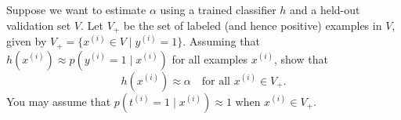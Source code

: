 \clearpage
\item {}
Suppose we want to estimate $\alpha$ using a trained classifier $h$ and a
held-out validation set $V$. Let $V_{+}$ be the set of labeled (and hence
positive) examples in $V$, given by $V_{+} = \{x^{(i)}\in V\mid y^{(i)} = 1\}$.
Assuming that  $h(x^{(i)})\approx p(y^{(i)} = 1\mid x^{(i)})$ for all
examples $x^{(i)}$, show that
%
\begin{equation*}
	h(x^{(i)}) \approx \alpha \quad\text{for all } x^{(i)}\in V_{+}.
\end{equation*}
%
You may assume that $p(t^{(i)} = 1\mid x^{(i)})\approx 1$ when
$x^{(i)}\in V_{+}$.

\ifnum{} {
  
} \fi
